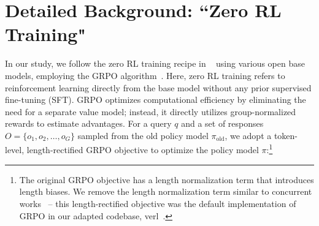 
\appendix

\section{Detailed Background: ``Zero RL Training"}
\label{sec:detailed_grpo}
In our study, we follow the zero RL training recipe in ~\citet{guo2025deepseek} using various open base models, employing the GRPO algorithm~\citep{shao2024deepseekmath}. Here, zero RL training refers to reinforcement learning directly from the base model without any prior supervised fine-tuning (SFT).
GRPO optimizes computational efficiency by eliminating the need for a separate value model; instead, it directly utilizes group-normalized rewards to estimate advantages. For a query \( q \) and a set of responses \( O = \{o_1, o_2, \dots, o_G\} \) sampled from the old policy model \( \pi_{\text{old}} \), we adopt a token-level, length-rectified GRPO objective to optimize the policy model \( \pi \):\footnote{The original GRPO objective has a length normalization term that introduces length biases. We remove the length normalization term similar to concurrent works~\citep{yu2025dapoopensourcellmreinforcement,liu2025understanding} -- this length-rectified objective was the default implementation of GRPO in our adapted codebase, verl~\citep{sheng2024hybridflow}.}



